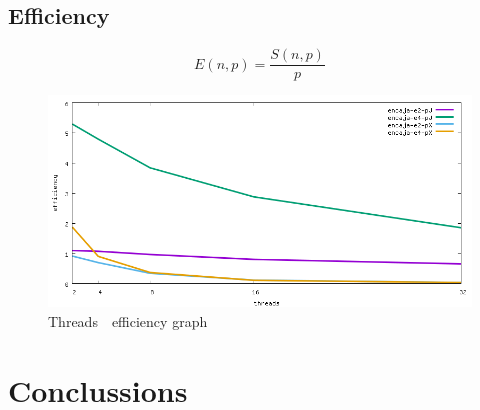 \documentclass[a4paper]{article}
\begin{document}
\subsection{Efficiency}
$$E(n,p)=\frac{S(n,p)}{p}$$

\begin{figure}[h]
    \centering
    \includegraphics[width=\textwidth]{../img/efficiency}
    \caption{Threads\, \textemdash \unskip \, efficiency graph}
\end{figure}

\section{Conclussions}
\end{document}
